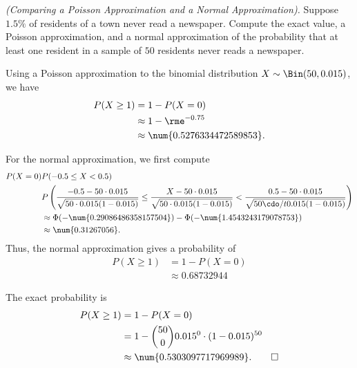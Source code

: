 \begin{problem}[Handout 14, \# 9]
  \emph{(Comparing a Poisson Approximation and a Normal Approximation).}
  Suppose \(1.5\%\) of residents of a town never read a newspaper. Compute
  the exact value, a Poisson approximation, and a normal approximation of
  the probability that at least one resident in a sample of \(50\)
  residents never reads a newspaper.
\end{problem}
\begin{solution}
  Using a Poisson approximation to the binomial distribution
  \(X\sim\Bin(50,0.015)\), we have
  \begin{align*}
    P(X\geq 1)
    &=1-P(X=0)\\
    &\approx 1-\rme^{-0.75}\\
    &\approx\num{0.5276334472589853}.
  \end{align*}

  For the normal approximation, we first compute
  \begin{align*}
    P(X=0)
    &P(-0.5\leq X<0.5)\\
    &P\left(\frac{-0.5-50\cdot 0.015}{\sqrt{50\cdot 0.015(1-0.015)}}
      \leq\frac{X-50\cdot 0.015}{\sqrt{50\cdot 0.015(1-0.015)}}
      <\frac{0.5-50\cdot 0.015}{\sqrt{50\cdo/t 0.015(1-0.015)}}
      \right)\\
    &\approx\Phi(-\num{0.29086486358157504})-\Phi(-\num{1.4543243179078753})\\
    &\approx\num{0.31267056}.
  \end{align*}
  Thus, the normal approximation gives a probability of
  \begin{align*}
    P(X\geq 1)&=1-P(X=0)\\
              &\approx\num{0.68732944}
  \end{align*}

  The exact probability is
  \begin{align*}
    P(X\geq 1)
    &=1-P(X=0)\\
    &=1-\binom{50}{0}0.015^0\cdot(1-0.015)^{50}\\
    &\approx\num{0.5303097717969989}.\qedhere
  \end{align*}
\end{solution}
\newpage


